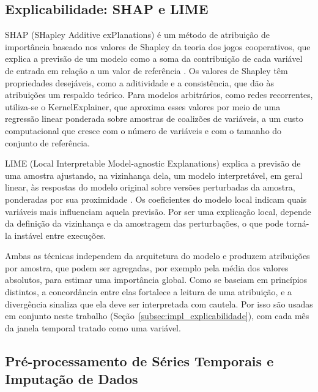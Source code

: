 \documentclass[
    12pt,
    openright,
    oneside,
    a4paper,
    english,
    brazil
]{abntex2}
\begin{document}
\subsection{Explicabilidade: SHAP e LIME}
\label{subsec:shap_lime}

SHAP (SHapley Additive exPlanations) é um método de atribuição de importância baseado nos valores de Shapley da teoria dos jogos cooperativos, que explica a previsão de um modelo como a soma da contribuição de cada variável de entrada em relação a um valor de referência \cite{Lundberg2017}. Os valores de Shapley têm propriedades desejáveis, como a aditividade e a consistência, que dão às atribuições um respaldo teórico. Para modelos arbitrários, como redes recorrentes, utiliza-se o KernelExplainer, que aproxima esses valores por meio de uma regressão linear ponderada sobre amostras de coalizões de variáveis, a um custo computacional que cresce com o número de variáveis e com o tamanho do conjunto de referência.

LIME (Local Interpretable Model-agnostic Explanations) explica a previsão de uma amostra ajustando, na vizinhança dela, um modelo interpretável, em geral linear, às respostas do modelo original sobre versões perturbadas da amostra, ponderadas por sua proximidade \cite{Ribeiro2016}. Os coeficientes do modelo local indicam quais variáveis mais influenciam aquela previsão. Por ser uma explicação local, depende da definição da vizinhança e da amostragem das perturbações, o que pode torná-la instável entre execuções.

Ambas as técnicas independem da arquitetura do modelo e produzem atribuições por amostra, que podem ser agregadas, por exemplo pela média dos valores absolutos, para estimar uma importância global. Como se baseiam em princípios distintos, a concordância entre elas fortalece a leitura de uma atribuição, e a divergência sinaliza que ela deve ser interpretada com cautela. Por isso são usadas em conjunto neste trabalho (Seção~\ref{subsec:impl_explicabilidade}), com cada mês da janela temporal tratado como uma variável.

\subsection{Pré-processamento de Séries Temporais e Imputação de Dados}
\label{subsec:preprocessamento}
\end{document}
